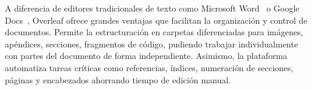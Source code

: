 A diferencia de editores tradicionales de texto como Microsoft Word~\cite{MicrosoftWord} o Google Docs~\cite{GoogleDocs}, Overleaf ofrece grandes ventajas que facilitan la organización y control de documentos. Permite la estructuración en carpetas diferenciadas para imágenes, apéndices, secciones, fragmentos de código, pudiendo trabajar individualmente con partes del documento de forma independiente. Asimismo, la plataforma automatiza tareas críticas como referencias, índices, numeración de secciones, páginas y encabezados ahorrando tiempo de edición manual.